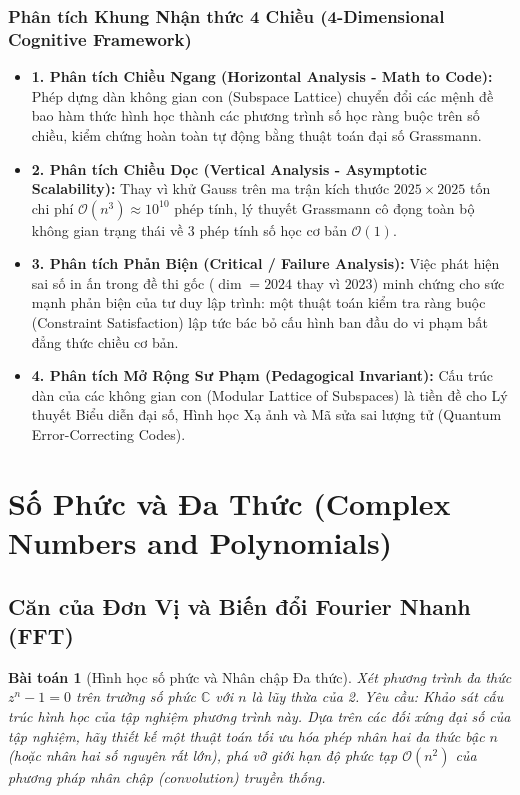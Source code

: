 \documentclass{article}
\newtheorem{baitoan}{Bài toán}
\begin{document}
\subsubsection*{Phân tích Khung Nhận thức 4 Chiều (4-Dimensional Cognitive Framework)}
\begin{itemize}
    \item \textbf{1. Phân tích Chiều Ngang (Horizontal Analysis - Math to Code):} Phép dựng dàn không gian con (Subspace Lattice) chuyển đổi các mệnh đề bao hàm thức hình học thành các phương trình số học ràng buộc trên số chiều, kiểm chứng hoàn toàn tự động bằng thuật toán đại số Grassmann.
    \item \textbf{2. Phân tích Chiều Dọc (Vertical Analysis - Asymptotic Scalability):} Thay vì khử Gauss trên ma trận kích thước $2025 \times 2025$ tốn chi phí $\mathcal{O}(n^3) \approx 10^{10}$ phép tính, lý thuyết Grassmann cô đọng toàn bộ không gian trạng thái về 3 phép tính số học cơ bản $\mathcal{O}(1)$.
    \item \textbf{3. Phân tích Phản Biện (Critical / Failure Analysis):} Việc phát hiện sai số in ấn trong đề thi gốc ($\dim=2024$ thay vì $2023$) minh chứng cho sức mạnh phản biện của tư duy lập trình: một thuật toán kiểm tra ràng buộc (Constraint Satisfaction) lập tức bác bỏ cấu hình ban đầu do vi phạm bất đẳng thức chiều cơ bản.
    \item \textbf{4. Phân tích Mở Rộng Sư Phạm (Pedagogical Invariant):} Cấu trúc dàn của các không gian con (Modular Lattice of Subspaces) là tiền đề cho Lý thuyết Biểu diễn đại số, Hình học Xạ ảnh và Mã sửa sai lượng tử (Quantum Error-Correcting Codes).
\end{itemize}



\section{Số Phức và Đa Thức (Complex Numbers and Polynomials)}
\subsection{Căn của Đơn Vị và Biến đổi Fourier Nhanh (FFT)}

\begin{baitoan}[Hình học số phức và Nhân chập Đa thức]
Xét phương trình đa thức $z^n - 1 = 0$ trên trường số phức $\mathbb{C}$ với $n$ là lũy thừa của 2. Yêu cầu: Khảo sát cấu trúc hình học của tập nghiệm phương trình này. Dựa trên các đối xứng đại số của tập nghiệm, hãy thiết kế một thuật toán tối ưu hóa phép nhân hai đa thức bậc $n$ (hoặc nhân hai số nguyên rất lớn), phá vỡ giới hạn độ phức tạp $\mathcal{O}(n^2)$ của phương pháp nhân chập (convolution) truyền thống.
\end{baitoan}
\end{document}
